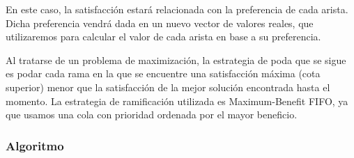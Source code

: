 \documentclass[a4paper, 11pt]{article} %
\begin{document}
	  En este caso, la satisfacción estará relacionada con la preferencia de cada arista. Dicha preferencia vendrá dada en un 
	  nuevo vector de valores reales, que utilizaremos para calcular el valor de cada arista en base a su preferencia. 
      
      Al tratarse de un problema de maximización, la estrategia de poda que se sigue es podar cada rama en la que se
      encuentre una satisfacción máxima (cota superior) menor que la satisfacción de la mejor solución encontrada hasta el
      momento. La estrategia de ramificación utilizada es Maximum-Benefit FIFO, ya que usamos una cola con prioridad
      ordenada por el mayor beneficio.
    
        \subsubsection{Algoritmo}    
        \small
        \texttt{}
        \normalsize        
    
\end{document}
